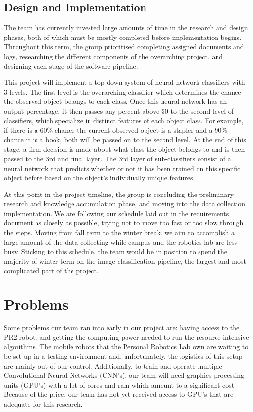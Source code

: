 \documentclass[draftclsnofoot, onecolumn, 10pt, compsoc]{IEEEtran}
\begin{document}
\subsection{Design and Implementation}
The team has currently invested large amounts of time in the research and design phases, both of which must be mostly completed before implementation begins. Throughout this term, the group prioritized completing assigned documents and logs, researching the different components of the overarching project, and designing each stage of the software pipeline.

This project will implement a top-down system of neural network classifiers with 3 levels. The first level is the overarching classifier which determines the chance the observed object belongs to each class. Once this neural network has an output percentage, it then passes any percent above 50 to the second level of classifiers, which specialize in distinct features of each object class. For example, if there is a 60\% chance the current observed object is a stapler and a 90\% chance it is a book, both will be passed on to the second level. At the end of this stage, a firm decision is made about what class the object belongs to and is then passed to the 3rd and final layer. The 3rd layer of sub-classifiers consist of a neural network that predicts whether or not it has been trained on this specific object before based on the object's individually unique features.
    
At this point in the project timeline, the group is concluding the preliminary research and knowledge accumulation phase, and moving into the data collection implementation. We are following our schedule laid out in the requirements document as closely as possible, trying not to move too fast or too slow through the steps. Moving from fall term to the winter break, we aim to accomplish a large amount of the data collecting while campus and the robotics lab are less busy. Sticking to this schedule, the team would be in position to spend the majority of winter term on the image classification pipeline, the largest and most complicated part of the project. 

\section{Problems}
Some problems our team ran into early in our project are: having access to the PR2 robot, and getting the computing power needed to run the resource intensive algorithms. The mobile robots that the Personal Robotics Lab own are waiting to be set up in a testing environment and, unfortunately, the logistics of this setup are mainly out of our control. Additionally, to train and operate multiple Convolutional Neural Networks (CNN's), our team will need graphics processing units (GPU's) with a lot of cores and ram which amount to a significant cost. Because of the price, our team has not yet received access to GPU's that are adequate for this research.
\end{document}
